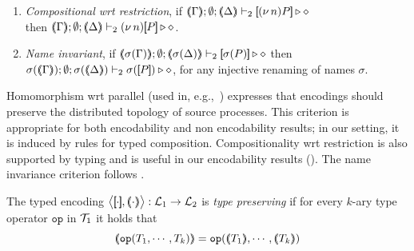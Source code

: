 \documentclass[runningheads]{llncs}
\begin{document}
{{\begin{definition}
\begin{enumerate}[1.]
		\item	\emph{Compositional wrt restriction},  if 
		$\mapt{\Gamma}; \emptyset; \mapt{\Delta} \proves_2 \map{\news{n}P} \hastype \Proc$ \\
		then 
		$\mapt{\Gamma}; \emptyset; \mapt{\Delta} \proves_2 \news{n}\map{P} \hastype \Proc$.
		
		\item \emph{Name invariant},   if
		$\mapt{\sigma(\Gamma)}; \emptyset; \mapt{\sigma(\Delta)} \proves_2 \map{\sigma(P)} \hastype \Proc$
		then \\
		$\sigma(\mapt{\Gamma}); \emptyset; \sigma(\mapt{\Delta}) \proves_2 \sigma(\map{P}) \hastype \Proc$, 
		for any injective renaming  of names $\sigma$.
	\end{enumerate}
\end{definition}


Homomorphism wrt parallel (used in, e.g.,~\cite{Palamidessi03,DBLP:conf/lics/PalamidessiSVV06})
expresses that encodings should preserve the distributed topology of source processes. This criterion
 is appropriate for both encodability and non encodability results; in our setting, it is
induced by rules for typed composition.
Compositionality wrt restriction 
is also supported by typing and is 
useful in our encodability results ().
The name invariance criterion follows \cite{DBLP:journals/iandc/Gorla10,DBLP:conf/icalp/LanesePSS10}. 


\begin{definition}
	\label{def:tp}
	The typed encoding 
	$\enco{\map{\cdot}, \mapt{\cdot}}: \tyl{L}_1 \to \tyl{L}_2$ is \emph{type preserving}
	if for every $k$-ary type operator $\mathtt{op}$ in ${\cal{T}}_1$ it holds that 
	 $$\mapt{\mathtt{op}(T_1, \cdots, T_k)} = \mathtt{op}(\mapt{T_1}, \cdots, \mapt{T_k})$$
	\end{definition}


}}
\end{document}
